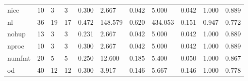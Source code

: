 \begin{longtable}{lp{1.8cm}p{1.8cm}p{1.8cm}p{1.8cm}p{1.8cm}p{1.8cm}p{1.8cm}p{1.8cm}p{1.8cm}p{1.8cm}}
nice      &                           10 &                  3 &                                 3 &                                      0.300 &                                  2.667 &                                        0.042 &                             5.000 &                                   0.042 &                              1.000 &                                              0.889 \\
nl        &                           36 &                 19 &                                17 &                                      0.472 &                                148.579 &                                        0.620 &                           434.053 &                                   0.151 &                              0.947 &                                              0.772 \\
nohup     &                           13 &                  3 &                                 3 &                                      0.231 &                                  2.667 &                                        0.042 &                             5.000 &                                   0.042 &                              1.000 &                                              0.889 \\
nproc     &                           10 &                  3 &                                 3 &                                      0.300 &                                  2.667 &                                        0.042 &                             5.000 &                                   0.042 &                              1.000 &                                              0.889 \\
numfmt    &                           20 &                  5 &                                 5 &                                      0.250 &                                 12.600 &                                        0.185 &                             5.400 &                                   0.050 &                              1.000 &                                              0.867 \\
od        &                           40 &                 12 &                                12 &                                      0.300 &                                  3.917 &                                        0.146 &                             5.667 &                                   0.146 &                              1.000 &                                              0.778 \\

\end{longtable}
